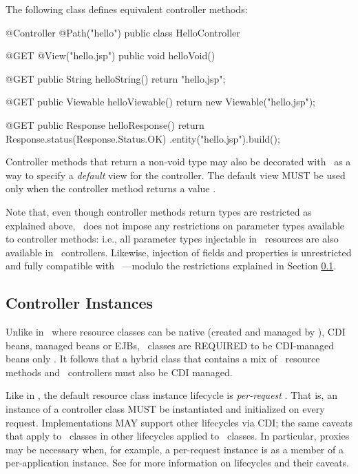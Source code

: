 The following class defines equivalent controller methods:

\begin{listing}{1}
@Controller
@Path("hello")
public class HelloController {

    @GET
    @View("hello.jsp")
    public void helloVoid() {
    }
    
    @GET
    public String helloString() {
        return "hello.jsp";
    }
    
    @GET
    public Viewable helloViewable() {
        return new Viewable("hello.jsp");
    }
    
    @GET
    public Response helloResponse() {
        return Response.status(Response.Status.OK)
                       .entity("hello.jsp").build();
    }    
}
\end{listing}

Controller methods that return a non-void type may also be decorated with \View\ as a 
way to specify a {\em default} view for the controller. The default view MUST be 
used only when the controller method returns a  value 
.

Note that, even though controller methods return types are restricted as 
explained above, \mvc\ does not impose any restrictions on parameter
types available to controller methods: i.e., all parameter types injectable
in \jaxrs\ resources are also available in \mvc\ controllers. Likewise, injection
of fields and properties is unrestricted and fully compatible with \jaxrs\ ---modulo
the restrictions explained in Section \ref{controller_instances}.

\subsection{Controller Instances}
\label{controller_instances}

Unlike in \jaxrs\ where resource classes can be native (created and managed by \jaxrs), 
CDI beans, managed beans or EJBs, \mvc\ classes are REQUIRED to be CDI-managed beans 
only . It follows that a hybrid class that contains a mix 
of \jaxrs\ resource methods and \mvc\ controllers must also be CDI managed. 

Like in \jaxrs, the default resource class instance lifecycle is {\em per-request}
.
That is, an instance of a controller class MUST be instantiated and initialized 
on every request. Implementations MAY support other lifecycles via CDI; the same caveats 
that apply to \jaxrs\ classes in other lifecycles applied to \mvc\ classes. In particular, 
proxies may be necessary when, for example, a per-request instance is as a member of a 
per-application instance. See \cite{jaxrs} for more information on lifecycles and 
their caveats.

